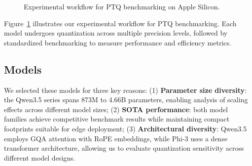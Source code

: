 \documentclass[conference]{IEEEtran}
\begin{document}
\begin{figure}[t]
\centering
{}
\caption{Experimental workflow for PTQ benchmarking on Apple Silicon.}
\label{fig:experimental_workflow}
\end{figure}

Figure~\ref{fig:experimental_workflow} illustrates our experimental workflow for PTQ benchmarking. Each model undergoes quantization across multiple precision levels, followed by standardized benchmarking to measure performance and efficiency metrics.

\subsection{Models}

We selected these models for three key reasons: (1) \textbf{Parameter size diversity}: the Qwen3.5 series spans 873M to 4.66B parameters, enabling analysis of scaling effects across different model sizes; (2) \textbf{SOTA performance}: both model families achieve competitive benchmark results while maintaining compact footprints suitable for edge deployment; (3) \textbf{Architectural diversity}: Qwen3.5 employs GQA attention with RoPE embeddings, while Phi-3 uses a dense transformer architecture, allowing us to evaluate quantization sensitivity across different model designs.
\end{document}
